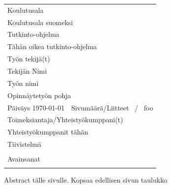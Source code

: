 \documentclass[a4paper, 11pt, oneside, finnish, includehead]{article}%
\newcommand{\theauthor}{Tekijän Nimi}
\newcommand{\thetitle}{Opinnäytetyön pohja}
\newcommand{\schoolfi}{Koulutusala suomeksi}
\newcommand{\publishdate}{\today} %
\newcommand{\totalappendix}{foo}
\newcommand{\totalpages}{\pageref{LastPage}}
\begin{document}
\noindent
\begin{tabular}{|p{8.75cm}|p{8.5cm}|}
\hline
\multicolumn{2}{|l|}{Koulutusala}\\
\multicolumn{2}{|l|}{\schoolfi}\\
\hline
\multicolumn{2}{|l|}{Tutkinto-ohjelma}\\
\multicolumn{2}{|l|}{Tähän oikea tutkinto-ohjelma}\\
\hline
\multicolumn{2}{|l|}{Työn tekijä(t)}\\
\multicolumn{2}{|l|}{\theauthor}\\
\hline
\multicolumn{2}{|l|}{Työn nimi}\\
\multicolumn{2}{|l|}{\thetitle}\\
\hline
Päiväys \hspace{1cm} \publishdate & Sivumäärä/Liitteet \hspace{1cm} \totalpages\ / \ \totalappendix \\
\hline
\multicolumn{2}{|l|}{Toimeksiantaja/Yhteistyökumppani(t)}\\
\multicolumn{2}{|l|}{Yhteistyökumppanit tähän}\\
\hline
\multicolumn{2}{|l|}{Tiivistelmä}\\
\multicolumn{2}{|l|}{

}\\ %
\hline
\multicolumn{2}{|l|}{Avainsanat}\\
\multicolumn{2}{|l|}{

}\\ %
\hline
\end{tabular}

\pagebreak

\pagestyle{fancy}

Abstract tälle sivulle. Kopsaa edellisen sivun taulukko
\pagebreak



\fancyhf{} %
\fancyhead[R]{\thepage\ (\totalpages)}

\setcounter{tocdepth}{3}
\tableofcontents
\pagebreak
\end{document}

